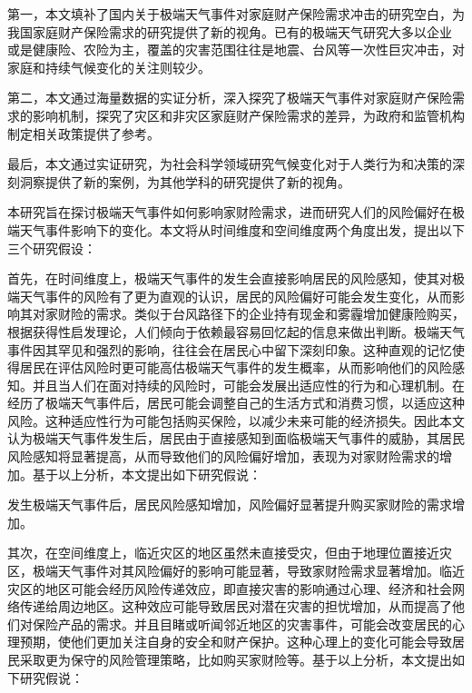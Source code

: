 第一，本文填补了国内关于极端天气事件对家庭财产保险需求冲击的研究空白，为我国家庭财产保险需求的研究提供了新的视角。已有的极端天气研究大多以企业 \citep{0Do}或是健康险\citep{赵强2021空气污染对商业健康保险需求的影响}、农险\citep{胡新艳2021气候变化}为主，覆盖的灾害范围往往是地震、台风等一次性巨灾冲击，对家庭和持续气候变化的关注则较少。

第二，本文通过海量数据的实证分析，深入探究了极端天气事件对家庭财产保险需求的影响机制，探究了灾区和非灾区家庭财产保险需求的差异，为政府和监管机构制定相关政策提供了参考。

最后，本文通过实证研究，为社会科学领域研究气候变化对于人类行为和决策的深刻洞察提供了新的案例，为其他学科的研究提供了新的视角。

本研究旨在探讨极端天气事件如何影响家财险需求，进而研究人们的风险偏好在极端天气事件影响下的变化。本文将从时间维度和空间维度两个角度出发，提出以下三个研究假设：

首先，在时间维度上，极端天气事件的发生会直接影响居民的风险感知，使其对极端天气事件的风险有了更为直观的认识，居民的风险偏好可能会发生变化，从而影响其对家财险的需求。类似于台风路径下的企业持有现金\citep{0Do}和雾霾增加健康险购买\citep{赵强2021空气污染对商业健康保险需求的影响}，根据获得性启发理论\citep{tversky1973availability}，人们倾向于依赖最容易回忆起的信息来做出判断。极端天气事件因其罕见和强烈的影响，往往会在居民心中留下深刻印象。这种直观的记忆使得居民在评估风险时更可能高估极端天气事件的发生概率，从而影响他们的风险感知。并且当人们在面对持续的风险时，可能会发展出适应性的行为和心理机制\citep{gigerenzer2011heuristic}。在经历了极端天气事件后，居民可能会调整自己的生活方式和消费习惯，以适应这种风险。这种适应性行为可能包括购买保险，以减少未来可能的经济损失。因此本文认为极端天气事件发生后，居民由于直接感知到面临极端天气事件的威胁，其居民风险感知将显著提高，从而导致他们的风险偏好增加，表现为对家财险需求的增加。基于以上分析，本文提出如下研究假说：

\begin{hyp} \label{hyp:1}
    发生极端天气事件后，居民风险感知增加，风险偏好显著提升购买家财险的需求增加。
\end{hyp}

其次，在空间维度上，临近灾区的地区虽然未直接受灾，但由于地理位置接近灾区，极端天气事件对其风险偏好的影响可能显著\citep{0Do}，导致家财险需求显著增加。临近灾区的地区可能会经历风险传递效应，即直接灾害的影响通过心理、经济和社会网络传递给周边地区。这种效应可能导致居民对潜在灾害的担忧增加，从而提高了他们对保险产品的需求。并且目睹或听闻邻近地区的灾害事件，可能会改变居民的心理预期，使他们更加关注自身的安全和财产保护。这种心理上的变化可能会导致居民采取更为保守的风险管理策略，比如购买家财险等。基于以上分析，本文提出如下研究假说：

